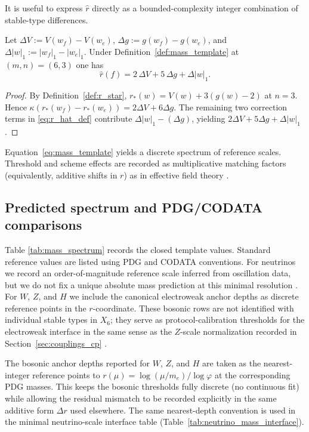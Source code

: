 It is useful to express $\widehat r$ directly as a bounded-complexity integer combination of stable-type differences.
\begin{proposition}\label{prop:rhat_simplified}
Let $\Delta V:=V(w_f)-V(w_e)$, $\Delta g:=g(w_f)-g(w_e)$, and $\Delta|w|_1:=|w_f|_1-|w_e|_1$.
Under Definition~\ref{def:mass_template} at $(m,n)=(6,3)$ one has
\begin{equation}\label{eq:rhat_251}
\widehat r(f)=2\,\Delta V+5\,\Delta g+\Delta|w|_1.
\end{equation}
\end{proposition}
\begin{proof}
By Definition~\ref{def:r_star}, $r_\ast(w)=V(w)+3(g(w)-2)$ at $n=3$.
Hence $\kappa(r_\ast(w_f)-r_\ast(w_e))=2\Delta V+6\Delta g$.
The remaining two correction terms in \eqref{eq:r_hat_def} contribute $\Delta|w|_1-(\Delta g)$, yielding $2\Delta V+5\Delta g+\Delta|w|_1$.
\end{proof}

Equation~\eqref{eq:mass_template} yields a discrete spectrum of reference scales.
Threshold and scheme effects are recorded as multiplicative matching factors (equivalently, additive shifts in $r$) as in effective field theory \cite{PeskinSchroeder1995,PDGRPP2024}.

\subsection{Predicted spectrum and PDG/CODATA comparisons}
\label{subsec:mass_spectrum_table}

Table \ref{tab:mass_spectrum} records the closed template values.
Standard reference values are listed using PDG and CODATA conventions.
For neutrinos we record an order-of-magnitude reference scale inferred from oscillation data, but we do not fix a unique absolute mass prediction at this minimal resolution \cite{PDGRPP2024,Esteban2020NuFIT}.
For $W$, $Z$, and $H$ we include the canonical electroweak anchor depths as discrete reference points in the $r$-coordinate.
These bosonic rows are not identified with individual stable types in $X_6$; they serve as protocol-calibration thresholds for the electroweak interface in the same sense as the $Z$-scale normalization recorded in Section~\ref{sec:couplings_cp} \cite{PDGRPP2024}.
\begin{remark}\label{rem:boson_anchor_depths}
The bosonic anchor depths reported for $W$, $Z$, and $H$ are taken as the nearest-integer reference points to $r(\mu)=\log(\mu/m_e)/\log\varphi$ at the corresponding PDG masses.
This keeps the bosonic thresholds fully discrete (no continuous fit) while allowing the residual mismatch to be recorded explicitly in the same additive form $\Delta r$ used elsewhere.
The same nearest-depth convention is used in the minimal neutrino-scale interface table (Table~\ref{tab:neutrino_mass_interface}).
\end{remark}
